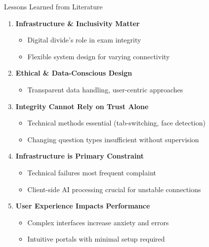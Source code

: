 \begin{frame}{Lessons Learned from Literature}
    \begin{enumerate}
        \item \textbf{Infrastructure \& Inclusivity Matter}
        \begin{itemize}
            \item Digital divide's role in exam integrity
            \item Flexible system design for varying connectivity
        \end{itemize}
        
        \item \textbf{Ethical \& Data-Conscious Design}
        \begin{itemize}
            \item Transparent data handling, user-centric approaches
        \end{itemize}
        
        \item \textbf{Integrity Cannot Rely on Trust Alone}
        \begin{itemize}
            \item Technical methods essential (tab-switching, face detection)
            \item Changing question types insufficient without supervision
        \end{itemize}
        
        \item \textbf{Infrastructure is Primary Constraint}
        \begin{itemize}
            \item Technical failures most frequent complaint
            \item Client-side AI processing crucial for unstable connections
        \end{itemize}
        
        \item \textbf{User Experience Impacts Performance}
        \begin{itemize}
            \item Complex interfaces increase anxiety and errors
            \item Intuitive portals with minimal setup required
        \end{itemize}
    \end{enumerate}
\end{frame}


